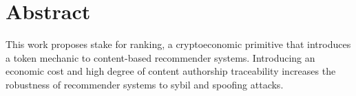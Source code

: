 \section{Abstract}

This work proposes stake for ranking, a cryptoeconomic primitive that introduces a token mechanic to content-based recommender systems. Introducing an economic cost and high degree of content authorship traceability increases the robustness of recommender systems to sybil and spoofing attacks. 